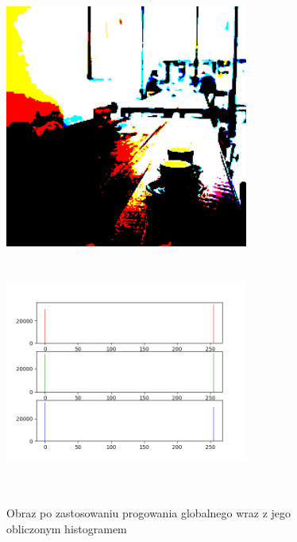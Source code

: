 \documentclass[a4paper,12pt]{book}
\begin{document}
\begin{figure}[H]
	\caption{Obraz po zastosowaniu progowania globalnego wraz z jego obliczonym histogramem}
	\includegraphics[width=8cm, height=8cm]{6-6/single-global-threshold-image-coffee.png}
	\includegraphics[width=8cm, height=8cm]{6-6/single-global-threshold-coffee.png}
\end{figure}
\end{document}
